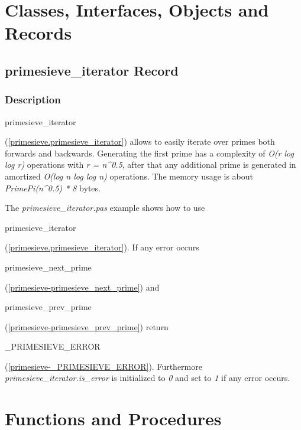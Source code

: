 \documentclass{report}
\newif\ifpdf
\begin{document}
\section{Classes, Interfaces, Objects and Records}
\ifpdf
\subsection*{\large{\textbf{primesieve{\_}iterator Record}}\normalsize\hspace{1ex}\hrulefill}
\else
\subsection*{primesieve{\_}iterator Record}
\fi
\label{primesieve.primesieve_iterator}
\subsubsection*{\large{\textbf{Description}}\normalsize\hspace{1ex}\hfill}
\begin{ttfamily}primesieve{\_}iterator\end{ttfamily}(\ref{primesieve.primesieve_iterator}) allows to easily iterate over primes both forwards and backwards. Generating the first prime has a complexity of \textit{O(r log log r)} operations with \textit{r = n{\^{}}0.5}, after that any additional prime is generated in amortized \textit{O(log n log log n)} operations. The memory usage is about \textit{PrimePi(n{\^{}}0.5) * 8} bytes.

The \textit{primesieve{\_}iterator.pas} example shows how to use \begin{ttfamily}primesieve{\_}iterator\end{ttfamily}(\ref{primesieve.primesieve_iterator}). If any error occurs \begin{ttfamily}primesieve{\_}next{\_}prime\end{ttfamily}(\ref{primesieve-primesieve_next_prime}) and \begin{ttfamily}primesieve{\_}prev{\_}prime\end{ttfamily}(\ref{primesieve-primesieve_prev_prime}) return \begin{ttfamily}{\_}PRIMESIEVE{\_}ERROR\end{ttfamily}(\ref{primesieve-_PRIMESIEVE_ERROR}). Furthermore \textit{primesieve{\_}iterator.is{\_}error} is initialized to \textit{0} and set to \textit{1} if any error occurs.\section{Functions and Procedures}
\ifpdf
\end{document}
